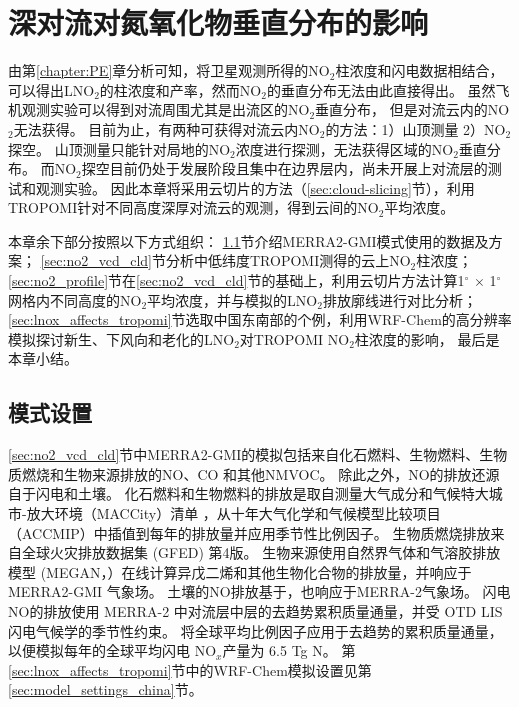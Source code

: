 
\chapter{深对流对氮氧化物垂直分布的影响} \label{sec:effects_on_nox_profile}

由第\ref{chapter:PE}章分析可知，将卫星观测所得的NO$_2$柱浓度和闪电数据相结合，
可以得出LNO$_2$的柱浓度和产率，然而NO$_2$的垂直分布无法由此直接得出。
虽然飞机观测实验可以得到对流周围尤其是出流区的NO$_2$垂直分布\citep{Barth.2019}，
但是对流云内的NO$_2$无法获得。
目前为止，有两种可获得对流云内NO$_2$的方法：1）山顶测量 2）NO$_2$探空。
山顶测量只能针对局地的NO$_2$浓度进行探测，无法获得区域的NO$_2$垂直分布\citep{Reiter.1970}。
而NO$_2$探空目前仍处于发展阶段且集中在边界层内\citep{Sluis.2010}，尚未开展上对流层的测试和观测实验。
因此本章将采用云切片的方法（\ref{sec:cloud-slicing}节），利用TROPOMI针对不同高度深厚对流云的观测，得到云间的NO$_2$平均浓度。

本章余下部分按照以下方式组织：
\ref{sec:model_settings_gmi}节介绍MERRA2-GMI模式使用的数据及方案；
\ref{sec:no2_vcd_cld}节分析中低纬度TROPOMI测得的云上NO$_2$柱浓度；
\ref{sec:no2_profile}节在\ref{sec:no2_vcd_cld}节的基础上，利用云切片方法计算1$^{\circ}$ $\times$ 1$^{\circ}$ 网格内不同高度的NO$_2$平均浓度，并与模拟的LNO$_2$排放廓线进行对比分析；
\ref{sec:lnox_affects_tropomi}节选取中国东南部的个例，利用WRF-Chem的高分辨率模拟探讨新生、下风向和老化的LNO$_2$对TROPOMI NO$_2$柱浓度的影响，
最后是本章小结。



\section{模式设置} \label{sec:model_settings_gmi}

\ref{sec:no2_vcd_cld}节中MERRA2-GMI的模拟包括来自化石燃料、生物燃料、生物质燃烧和生物来源排放的NO、CO 和其他NMVOC。
除此之外，NO的排放还源自于闪电和土壤。
化石燃料和生物燃料的排放是取自测量大气成分和气候特大城市-放大环境（MACCity）清单\citep{Granier.2011}
，从十年大气化学和气候模型比较项目（ACCMIP）中插值到每年的排放量并应用季节性比例因子\citep{Lamarque.2010}。
生物质燃烧排放来自全球火灾排放数据集 (GFED) 第4版\citep{Giglio.2013}。
生物来源使用自然界气体和气溶胶排放模型 (MEGAN，\citet{Guenther.1999}）在线计算异戊二烯和其他生物化合物的排放量，并响应于MERRA2-GMI 气象场。
土壤的NO排放基于\citet{Yienger.1995}，也响应于MERRA-2气象场。
闪电NO的排放使用 MERRA-2 中对流层中层的去趋势累积质量通量\citep{Allen.2010}，并受 OTD LIS闪电气候学的季节性约束\citep{Cecil.2014}。
将全球平均比例因子应用于去趋势的累积质量通量，以便模拟每年的全球平均闪电 NO$_x$产量为 6.5 Tg N。
第\ref{sec:lnox_affects_tropomi}节中的WRF-Chem模拟设置见第\ref{sec:model_settings_china}节。

